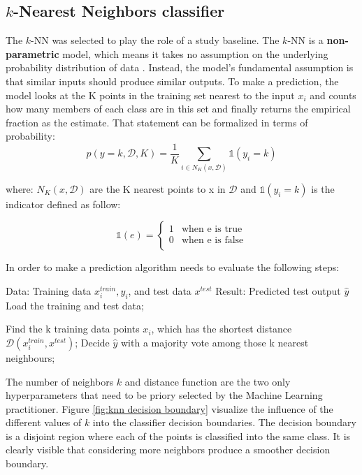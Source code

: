 \subsection{$k$-Nearest Neighbors classifier}
The $k$-NN was selected to play the role of a study baseline. The $k$-NN  is a \textbf{non-parametric} model, which means it takes no assumption on the underlying probability distribution of data \cite{knn}. 
Instead, the model's fundamental assumption is that similar inputs should produce similar outputs. To make a prediction, the model looks at the K points in the training set nearest to the input $x_i$ and counts how many members of each class are in this set and finally returns the empirical fraction as the estimate. That statement can be formalized in terms of probability:  
\begin{equation}
p(y=k,\mathcal{D}, K) = \frac{1}{K} \sum_{i\in N_K(x,\mathcal{D})} \mathds{1}(y_i=k)
\end{equation}

where: 
$N_K(x,\mathcal{D})$ are the K nearest points to x in $\mathcal{D}$ and $\mathds{1}(y_i=k)$ is the indicator defined as follow: 

\begin{equation}
    \mathds{1}(e) = \left\{ \begin{array}{ll}
1 & \textrm{when e is true}\\
0 & \textrm{when e is false}\\
\end{array} \right.
\end{equation}

In order to make a prediction algorithm needs to evaluate the following steps: 
\begin{algorithm}[caption={k-nearest neighbour, $k$-NN }, label={knn}]
Data: Training data ${x^{train}_{i} , y_{i}}$, and test data ${x^{test}}$
Result: Predicted test output $\hat{y}$
Load the training and test data;

Find the k training data points $x_i$, which has the shortest distance$\mathcal{D}(x^{train}_i, x^{test})$;
Decide $\hat{y}$ with a majority vote among those k nearest neighbours;  
\end{algorithm}

The number of neighbors $k$ and distance function are the two only hyperparameters that need to be priory selected by the Machine Learning practitioner. Figure \ref{fig:knn decision boundary} visualize the influence of the different values of $k$ into the classifier decision boundaries. The decision boundary is a disjoint region where each of the points is classified into the same class. It is clearly visible that considering more neighbors produce a smoother decision boundary. 

